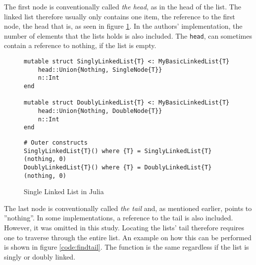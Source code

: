 \documentclass[a4paper, 11pt]{article}
\begin{document}
    The first node is conventionally called \emph{the head}, as in the head of the list. 
    The linked list therefore usually only contains one item, the reference to the first node, the 
    head that is, as seen in figure \ref{code:SingleList}. In the authors' implementation, 
    the number of elements that the lists holds is also included. 
    The \texttt{head}, can
    sometimes contain a reference to nothing, if the list is empty. 
    \begin{figure}[H]
        \centering
    \begin{verbatim}
mutable struct SinglyLinkedList{T} <: MyBasicLinkedList{T}
    head::Union{Nothing, SingleNode{T}}
    n::Int
end

mutable struct DoublyLinkedList{T} <: MyBasicLinkedList{T}
    head::Union{Nothing, DoubleNode{T}}
    n::Int
end
    \end{verbatim}
    \begin{verbatim}
# Outer constructs
SinglyLinkedList{T}() where {T} = SinglyLinkedList{T}(nothing, 0)
DoublyLinkedList{T}() where {T} = DoublyLinkedList{T}(nothing, 0)
    \end{verbatim}
    \caption{Single Linked List in Julia}
    \label{code:SingleList}
    \end{figure}
    The last node is conventionally called \emph{the tail} and, as mentioned earlier, 
    points to ''nothing''. In some implementations, a reference to the tail is also included. 
    However, it was omitted in this study.
    Locating the lists' tail therefore requires one to traverse through the entire list.
    An example on how this can be performed is shown in figure \ref{code:findtail}. 
    The function is the same regardless if the list is singly or doubly linked.
\end{document}
